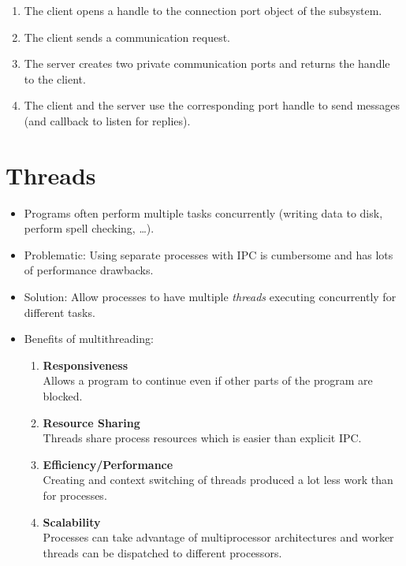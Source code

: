 \documentclass[a4paper, 11pt, accentcolor = tud3b]{tudreport}
\begin{document}
		            \begin{enumerate}
		            	\item The client opens a handle to the connection port object of the subsystem.
		            	\item The client sends a communication request.
		            	\item The server creates two private communication ports and returns the handle to the client.
		            	\item The client and the server use the corresponding port handle to send messages (and callback to listen for replies).
		            \end{enumerate}

    \chapter{Threads}
	    \begin{itemize}
	    	\item Programs often perform multiple tasks concurrently (writing data to disk, perform spell checking, \dots).
	    	\item Problematic: Using separate processes with IPC is cumbersome and has lots of performance drawbacks.
	    	\item Solution: Allow processes to have multiple \textit{threads} executing concurrently for different tasks.
	    	\item Benefits of multithreading:
		    	\begin{enumerate}
		    		\item \textbf{Responsiveness} \\ Allows a program to continue even if other parts of the program are blocked.
		    		\item \textbf{Resource Sharing} \\ Threads share process resources which is easier than explicit IPC.
		    		\item \textbf{Efficiency/Performance} \\ Creating and context switching of threads produced a lot less work than for processes.
		    		\item \textbf{Scalability} \\ Processes can take advantage of multiprocessor architectures and worker threads can be dispatched to different processors.
		    	\end{enumerate}
	    \end{itemize}
    
\end{document}
